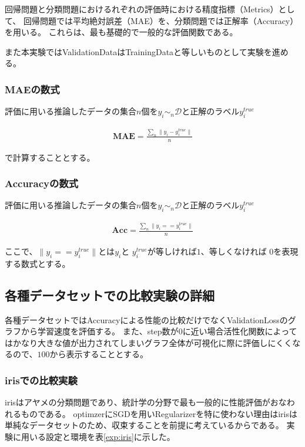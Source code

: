 回帰問題と分類問題におけるれぞれの評価時における精度指標（Metrics）として、
回帰問題では平均絶対誤差（MAE）を、分類問題では正解率（Accuracy）を用いる。
これらは、最も基礎的で一般的な評価関数である。

また本実験ではValidationDataはTrainingDataと等しいものとして実験を進める。


\subsubsection{MAEの数式}


評価に用いる推論したデータの集合$n$個を$ y_i \sim_n \mathcal{D}$と正解のラベル$ y_i^{true} $

\begin{eqnarray}
\mathbf{MAE} = \frac{\sum_n \|y_i - y_i^{true}\|}{n}
\label{eq:accuracy}
\end{eqnarray}

で計算することとする。


\subsubsection{Accuracyの数式}

評価に用いる推論したデータの集合$n$個を$ y_i \sim_n \mathcal{D}$と正解のラベル$ y_i^{true} $

\begin{eqnarray}
\mathbf{Acc} = \frac{\sum_n \|y_i == y_i^{true}\|}{n}
\label{eq:accuracy}
\end{eqnarray}

ここで、$ \|y_i == y_i^{true}\| $とは$ y_i $と $ y_i^{true} $が等しければ$ 1 $、等しくなければ $ 0 $を表現する数式とする。

\subsection{各種データセットでの比較実験の詳細}

各種データセットではAccuracyによる性能の比較だけでなくValidationLossのグラフから学習速度を評価する。
また、step数が$0$に近い場合活性化関数によってはかなり大きな値が出力されてしまいグラフ全体が可視化に際に評価しにくくなるので、$100$から表示することとする。

\subsubsection{irisでの比較実験}
\label{impl:iris}

irisはアヤメの分類問題であり、統計学の分野で最も一般的に性能評価がおなわれるものである。
optimzerにSGDを用いRegularizerを特に使わない理由はirisは単純なデータセットのため、収束することを前提に考えているからである。
実験に用いる設定と環境を表\ref{exp:iris}に示した。


